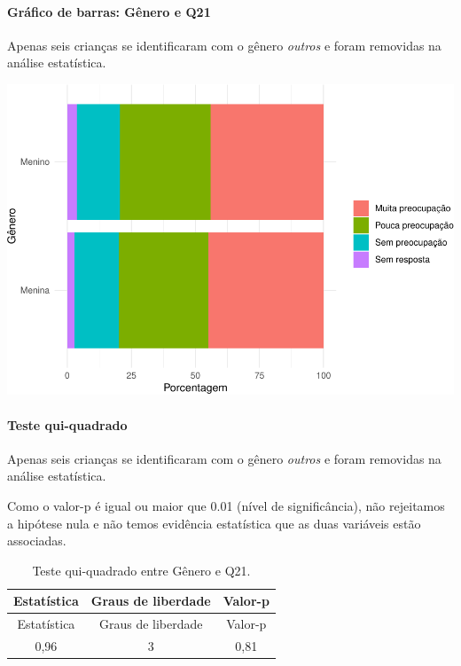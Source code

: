 \documentclass[]{article}
\let\oldparagraph\paragraph
\renewcommand{\paragraph}[1]{\oldparagraph{#1}\mbox{}}
\begin{document}
\hypertarget{gruxe1fico-de-barras-guxeanero-e-q21}{%
\paragraph{Gráfico de barras: Gênero e Q21}\label{gruxe1fico-de-barras-guxeanero-e-q21}}

Apenas seis crianças se identificaram com o gênero \emph{outros} e foram removidas na análise estatística.

\begin{center}\includegraphics[width=0.75\linewidth]{relatorio_covid19_files/figure-latex/unnamed-chunk-437-1} \end{center}

\hypertarget{teste-qui-quadrado-38}{%
\paragraph{Teste qui-quadrado}\label{teste-qui-quadrado-38}}

Apenas seis crianças se identificaram com o gênero \emph{outros} e foram removidas na análise estatística.

Como o valor-p é igual ou maior que 0.01 (nível de significância), não rejeitamos a hipótese nula e não temos evidência estatística que as duas variáveis estão associadas.

\begin{longtable}[]{@{}ccc@{}}
\caption{\label{tab:unnamed-chunk-439}Teste qui-quadrado entre Gênero e Q21.}\tabularnewline
\toprule
Estatística & Graus de liberdade & Valor-p\tabularnewline
\midrule
\endfirsthead
\toprule
Estatística & Graus de liberdade & Valor-p\tabularnewline
\midrule
\endhead
0,96 & 3 & 0,81\tabularnewline
\bottomrule
\end{longtable}

\cleardoublepage
\end{document}
